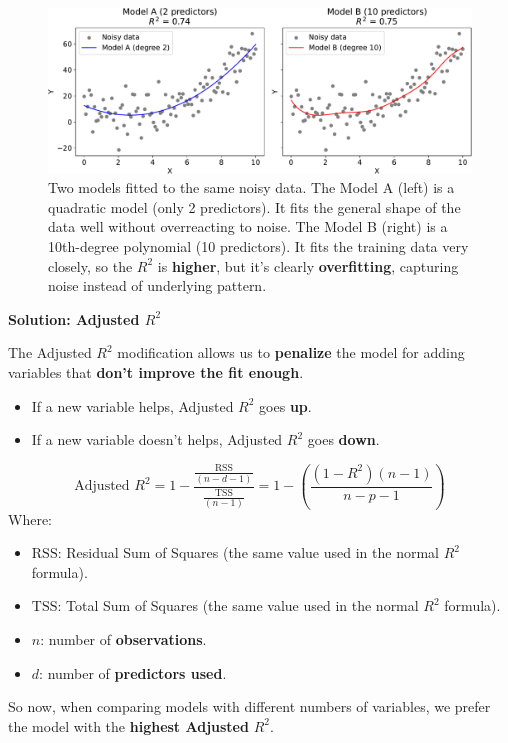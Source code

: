 \newpage

\begin{figure}[!htp]
    \centering
    \includegraphics[width=\textwidth]{img/model-selection-and-regularization/problem-with-r2.pdf}
    \caption{Two models fitted to the same noisy data. The Model A (left) is a quadratic model (only 2 predictors). It fits the general shape of the data well without overreacting to noise. The Model B (right) is a 10th-degree polynomial (10 predictors). It fits the training data very closely, so the $R^2$ is \textbf{higher}, but it's clearly \textbf{overfitting}, capturing noise instead of underlying pattern.}
\end{figure}

\highspace
\begin{flushleft}
    \textcolor{Green3}{ \textbf{Solution: Adjusted $R^2$}}
\end{flushleft}
The Adjusted $R^2$ modification allows us to \textbf{penalize} the model for adding variables that \textbf{don't improve the fit enough}.
\begin{itemize}
    \item[\textcolor{Green3}{\faIcon{check-circle}}] If a new variable helps, Adjusted $R^2$ goes \textbf{up}.
    \item[\textcolor{Red2}{\faIcon{times-circle}}] If a new variable doesn't helps, Adjusted $R^2$ goes \textbf{down}.
\end{itemize}
\begin{equation}
    \text{Adjusted } R^2 = 1 - \dfrac{\frac{\text{RSS}}{\left(n - d - 1\right)}}{\frac{\text{TSS}}{\left(n - 1\right)}} = 1 - \left(\dfrac{
        \left(1 - R^2\right)\left(n - 1\right)
    }{
        n - p - 1
    }\right)
\end{equation}
Where:
\begin{itemize}
    \item $\text{RSS}$: Residual Sum of Squares (the same value used in the normal $R^2$ formula).
    \item $\text{TSS}$: Total Sum of Squares (the same value used in the normal $R^2$ formula).
    \item $n$: number of \textbf{observations}.
    \item $d$: number of \textbf{predictors used}.
\end{itemize}
So now, when comparing models with different numbers of variables, we prefer the model with the \textbf{highest Adjusted} $R^2$.

